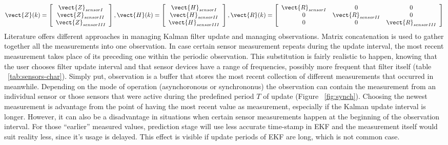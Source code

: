 \begin{equation}
\label{eq:concatenate-mes} 
\vect{Z}(k) = \left[ \begin{array}{c} \vect{Z}_{sensor I} \\ \vect{Z}_{sensor II} \\ \vect{Z}_{sensor III} \end{array} \right],
\vect{H}(k) = \left[ \begin{array}{c} \vect{H}_{sensor I} \\ \vect{H}_{sensor II} \\ \vect{H}_{sensor III} \end{array} \right], 
\vect{R}(k) = \left[ \begin{array}{ccc} \vect{R}_{sensor I} & 0 & 0 \\ 0 & \vect{R}_{sensor II} & 0 \\ 0 & 0 & \vect{R}_{sensor III} \end{array} \right]
\end{equation}
Literature offers different approaches in managing Kalman filter update and managing observations. Matrix concatenation is used to gather together all the measurements into one observation. In case certain sensor measurement repeats during the update interval, the most recent measurement takes place of its preceding one within the periodic observation. This substitution is fairly realistic to happen, knowing that the user chooses filter update interval and that sensor devices have a range of frequencies, possibly more frequent that filter itself (table ~\ref{tab:sensors-char}). Simply put, observation is a buffer that stores the most recent collection of different measurements that occurred in meanwhile. Depending on the mode of operation (asynchoronous or synchrononus) the observation can contain the measurement from an individual sensor or those sensors that were active during the predefined period $T$ of update (Figure ~\ref{fig:synch}). Choosing the newest measurement is advantage from the point of having the most recent value as measurement, especially if the Kalman update interval is longer. However, it can also be a disadvantage in situations when certain sensor measurements happen at the beginning of the observation interval. For those ``earlier'' measured values, prediction stage will use less accurate time-stamp in EKF and the measurement itself would suit reality less, since it's usage is delayed. This effect is visible if update periods of EKF are long, which is not common case.  

